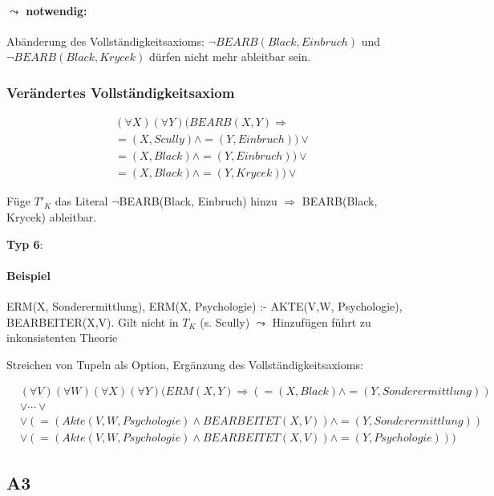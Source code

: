 \documentclass[12pt, a4paper]{article}
\begin{document}
\paragraph{$\leadsto$ notwendig:} Abänderung des Vollständigkeitsaxioms: $\lnot BEARB(Black, Einbruch)$ und $\lnot BEARB(Black, Krycek)$ dürfen nicht mehr ableitbar sein.

\subsubsection*{Verändertes Vollständigkeitsaxiom}
\begin{align}
&(\forall X)(\forall Y) (BEARB(X,Y) \Rightarrow \\
&=(X,Scully) \wedge =(Y, Einbruch)) \vee \\
&=(X,Black) \wedge =(Y, Einbruch)) \vee \\
&=(X,Black) \wedge =(Y, Krycek)) \vee 
\end{align}

Füge $T'_K$ das Literal $\lnot$BEARB(Black, Einbruch) hinzu $\Rightarrow$ BEARB(Black, Krycek) ableitbar.

\textbf{Typ 6}:

\paragraph{Beispiel} ERM(X, Sonderermittlung), ERM(X, Psychologie) :- AKTE(V,W, Psychologie), BEARBEITER(X,V).
Gilt nicht in $T_K$ (s. Scully) $\leadsto$ Hinzufügen führt zu inkonsistenten Theorie

Streichen von Tupeln als Option, Ergänzung des Vollständigkeitsaxioms:

\begin{align}
&(\forall V)(\forall W)(\forall X)(\forall Y)(ERM(X,Y) \Rightarrow (=(X, Black) \wedge =(Y, Sonderermittlung)) \\
&\vee \cdots \vee \\
&\vee (=(Akte(V,W, Psychologie) \wedge BEARBEITET(X,V)) \wedge =(Y, Sonderermittlung)) \\
&\vee (=(Akte(V,W, Psychologie) \wedge BEARBEITET(X,V)) \wedge =(Y, Psychologie)))
\end{align}

\subsection*{A3}
\end{document}
